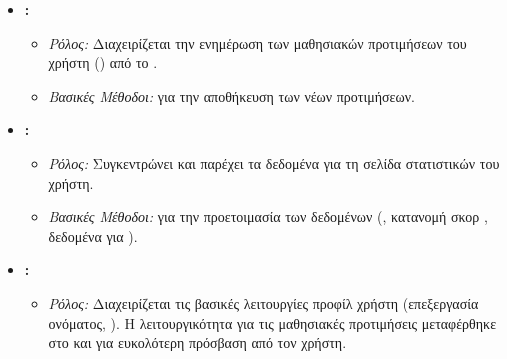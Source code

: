 \begin{itemize}[leftmargin=*, noitemsep]
\begin{itemize}[leftmargin=+, noitemsep]
        \end{itemize}
    \item \textbf{\texttt{}:}
        \begin{itemize}[leftmargin=+, noitemsep]
            \item \textit{Ρόλος:} Διαχειρίζεται την ενημέρωση των μαθησιακών προτιμήσεων του χρήστη () από το .
            \item \textit{Βασικές Μέθοδοι:} \texttt{} για την αποθήκευση των νέων προτιμήσεων.
        \end{itemize}
    \item \textbf{\texttt{}:}
        \begin{itemize}[leftmargin=+, noitemsep]
            \item \textit{Ρόλος:} Συγκεντρώνει και παρέχει τα δεδομένα για τη σελίδα στατιστικών του χρήστη.
            \item \textit{Βασικές Μέθοδοι:} \texttt{} για την προετοιμασία των δεδομένων (, κατανομή σκορ , δεδομένα για ).
        \end{itemize}
    \item \textbf{\texttt{}:}
        \begin{itemize}[leftmargin=+, noitemsep]
            \item \textit{Ρόλος:} Διαχειρίζεται τις βασικές λειτουργίες προφίλ χρήστη (επεξεργασία ονόματος, ). Η λειτουργικότητα για τις μαθησιακές προτιμήσεις μεταφέρθηκε στο  και  για ευκολότερη πρόσβαση από τον χρήστη.
        \end{itemize}
\end{itemize}

